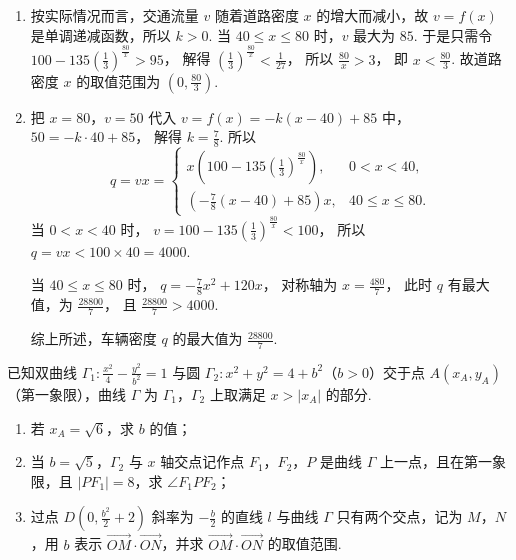 \begin{solution}
\begin{enumerate}
\item 按实际情况而言，交通流量 \(v\) 随着道路密度 \(x\) 的增大而减小，故 \(v=f(x)\) 是单调递减函数，所以 \(k>0\).
当 \(40\le x\le80\) 时，\(v\) 最大为 \(85\).
于是只需令
\(100-135\left(\frac13\right)^{\frac{80}{x}}>95\)，
解得
\(\left(\frac13\right)^{\frac{80}{x}}<\frac1{27}\)，
所以
\(\frac{80}{x}>3\)，
即
\(x<\frac{80}{3}\).
故道路密度 \(x\) 的取值范围为 \(\left(0,\frac{80}{3}\right)\).

\item 把 \(x=80\)，\(v=50\) 代入 \(v=f(x)=-k(x-40)+85\) 中，
\(50=-k\cdot40+85\)，
解得
\(k=\frac78\).
所以
\[
q=vx=
\begin{cases}
x\left(100-135\left(\frac13\right)^{\frac{80}{x}}\right), & 0<x<40,\\
\left(-\frac78(x-40)+85\right)x, & 40\le x\le80.
\end{cases}
\]
当 \(0<x<40\) 时，
\(v=100-135\left(\frac13\right)^{\frac{80}{x}}<100\)，
所以
\(q=vx<100\times40=4000\).

当 \(40\le x\le80\) 时，
\(q=-\frac78x^2+120x\)，
对称轴为
\(x=\frac{480}{7}\)，
此时 \(q\) 有最大值，为
\(\frac{28800}{7}\)，
且 \(\frac{28800}{7}>4000\).

综上所述，车辆密度 \(q\) 的最大值为
\(\frac{28800}{7}\).
\end{enumerate}
\end{solution}

\begin{problem}
已知双曲线 \(\Gamma_1:\frac{x^2}{4}-\frac{y^2}{b^2}=1\) 与圆 \(\Gamma_2:x^2+y^2=4+b^2\)（\(b>0\)）交于点 \(A(x_A,y_A)\)（第一象限），曲线 \(\Gamma\) 为 \(\Gamma_1\)，\(\Gamma_2\) 上取满足 \(x>|x_A|\) 的部分.

\begin{enumerate}
\item 若 \(x_A=\sqrt6\)，求 \(b\) 的值；
\item 当 \(b=\sqrt5\)，\(\Gamma_2\) 与 \(x\) 轴交点记作点 \(F_1\)，\(F_2\)，\(P\) 是曲线 \(\Gamma\) 上一点，且在第一象限，且 \(|PF_1|=8\)，求 \(\angle F_1PF_2\)；
\item 过点 \(D\left(0,\frac{b^2}{2}+2\right)\) 斜率为 \(-\frac{b}{2}\) 的直线 \(l\) 与曲线 \(\Gamma\) 只有两个交点，记为 \(M\)，\(N\)，用 \(b\) 表示 \(\overrightarrow{OM}\cdot\overrightarrow{ON}\)，并求 \(\overrightarrow{OM}\cdot\overrightarrow{ON}\) 的取值范围.
\end{enumerate}
\end{problem}

